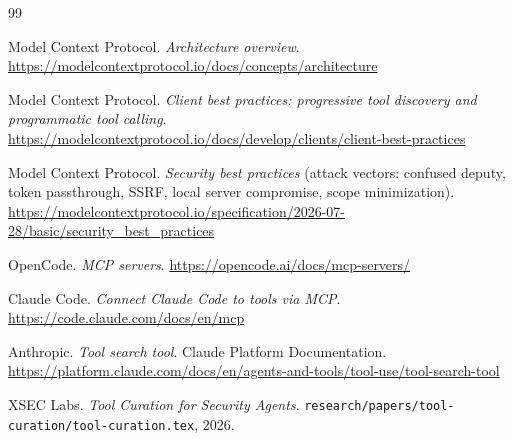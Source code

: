 \documentclass[11pt]{article}
\begin{document}
\begin{thebibliography}{99}

Model Context Protocol. \textit{Architecture overview}.
\url{https://modelcontextprotocol.io/docs/concepts/architecture}

Model Context Protocol. \textit{Client best practices: progressive tool
discovery and programmatic tool calling}.
\url{https://modelcontextprotocol.io/docs/develop/clients/client-best-practices}

Model Context Protocol. \textit{Security best practices} (attack vectors:
confused deputy, token passthrough, SSRF, local server compromise, scope
minimization).
\url{https://modelcontextprotocol.io/specification/2026-07-28/basic/security_best_practices}

OpenCode. \textit{MCP servers}.
\url{https://opencode.ai/docs/mcp-servers/}

Claude Code. \textit{Connect Claude Code to tools via MCP}.
\url{https://code.claude.com/docs/en/mcp}

Anthropic. \textit{Tool search tool}. Claude Platform Documentation.
\url{https://platform.claude.com/docs/en/agents-and-tools/tool-use/tool-search-tool}

XSEC Labs. \textit{Tool Curation for Security Agents}.
\texttt{research/papers/tool-curation/tool-curation.tex}, 2026.

\end{thebibliography}
\end{document}
